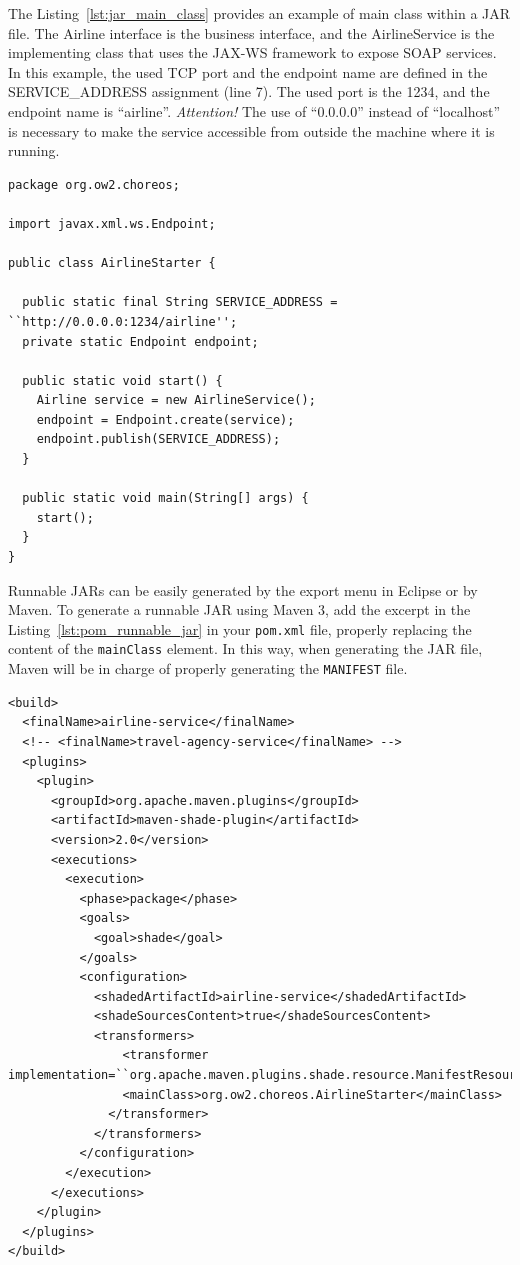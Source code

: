 \documentclass[a4paper, 10pt]{article}
\begin{document}
The Listing~\ref{lst:jar_main_class} provides an example of main class within a JAR file. The \textsf{Airline} interface is the business interface, and the \textsf{AirlineService} is the implementing class that uses the JAX-WS framework to expose SOAP services. In this example, the used TCP port and the endpoint name are defined in the SERVICE\_ADDRESS assignment (line 7). The used port is the 1234, and the endpoint name is ``airline''. \emph{Attention!} The use of ``0.0.0.0'' instead of ``localhost'' is necessary to make the service accessible from outside the machine where it is running. 


\lstset{
language=Java,
numbers=left
}

{\footnotesize
\begin{lstlisting}[caption=Example of a class with the main method within a JAR file, label=lst:jar_main_class]
package org.ow2.choreos;

import javax.xml.ws.Endpoint;

public class AirlineStarter {

  public static final String SERVICE_ADDRESS = ``http://0.0.0.0:1234/airline'';
  private static Endpoint endpoint;
	
  public static void start() {
    Airline service = new AirlineService();
    endpoint = Endpoint.create(service);
    endpoint.publish(SERVICE_ADDRESS);
  }

  public static void main(String[] args) {	
    start();
  }
}
\end{lstlisting}
}

Runnable JARs can be easily generated by the export menu in Eclipse or by Maven. To generate a runnable JAR using Maven 3, add the excerpt in the Listing~\ref{lst:pom_runnable_jar} in your \texttt{pom.xml} file, properly replacing the content of the \texttt{mainClass} element. In this way, when generating the JAR file, Maven will be in charge of properly generating the \texttt{MANIFEST} file.

\lstset{
language=XML
}

{\footnotesize
\begin{lstlisting}[caption=Excerpt of pom file to generate a runnable JAR using Maven 3, label=lst:pom_runnable_jar]
<build>
  <finalName>airline-service</finalName> 
  <!-- <finalName>travel-agency-service</finalName> -->
  <plugins>
    <plugin>
      <groupId>org.apache.maven.plugins</groupId>
      <artifactId>maven-shade-plugin</artifactId>
      <version>2.0</version>
      <executions>
        <execution>
          <phase>package</phase>
          <goals>
            <goal>shade</goal>
          </goals>
          <configuration>
            <shadedArtifactId>airline-service</shadedArtifactId>
            <shadeSourcesContent>true</shadeSourcesContent>
            <transformers>
                <transformer 
implementation=``org.apache.maven.plugins.shade.resource.ManifestResourceTransformer''>
                <mainClass>org.ow2.choreos.AirlineStarter</mainClass>
              </transformer>
            </transformers>
          </configuration>
        </execution>
      </executions>
    </plugin>
  </plugins>
</build>
\end{lstlisting}
}
\end{document}
